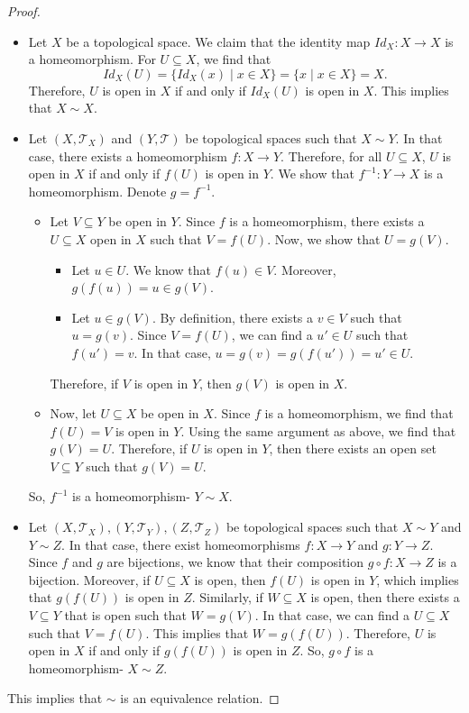 \documentclass[a4paper, openany]{memoir}
\theoremstyle{definition}
\theoremstyle{plain}
\begin{document}
\begin{proof}
\hspace*{0pt}
\begin{itemize}
    \item Let $X$ be a topological space. We claim that the identity map $Id_X: X \to X$ is a homeomorphism. For $U \subseteq X$, we find that
    \[Id_X(U) = \{Id_X(x) \mid x \in X\} = \{x \mid x \in X\} = X.\]
    Therefore, $U$ is open in $X$ if and only if $Id_X(U)$ is open in $X$. This implies that $X \sim X$.
    
    \item Let $(X, \mathcal{T}_X)$ and $(Y, \mathcal{T})$ be topological spaces such that $X \sim Y$. In that case, there exists a homeomorphism $f: X \to Y$. Therefore, for all $U \subseteq X$, $U$ is open in $X$ if and only if $f(U)$ is open in $Y$. We show that $f^{-1}: Y \to X$ is a homeomorphism. Denote $g = f^{-1}$. 
    \begin{itemize}
        \item Let $V \subseteq Y$ be open in $Y$. Since $f$ is a homeomorphism, there exists a $U \subseteq X$ open in $X$ such that $V = f(U)$. Now, we show that $U = g(V)$.
        \begin{itemize}
            \item Let $u \in U$. We know that $f(u) \in V$. Moreover, $g(f(u)) = u \in g(V)$.
            
            \item Let $u \in g(V)$. By definition, there exists a $v \in V$ such that $u = g(v)$. Since $V = f(U)$, we can find a $u' \in U$ such that $f(u') = v$. In that case, $u = g(v) = g(f(u')) = u' \in U$.
        \end{itemize}
        Therefore, if $V$ is open in $Y$, then $g(V)$ is open in $X$.
        
        \item Now, let $U \subseteq X$ be open in $X$. Since $f$ is a homeomorphism, we find that $f(U) = V$ is open in $Y$. Using the same argument as above, we find that $g(V) = U$. Therefore, if $U$ is open in $Y$, then there exists an open set $V \subseteq Y$ such that $g(V) = U$.
    \end{itemize}
    So, $f^{-1}$ is a homeomorphism- $Y \sim X$.
    
    \item Let $(X, \mathcal{T}_X), (Y, \mathcal{T}_Y), (Z, \mathcal{T}_Z)$ be topological spaces such that $X \sim Y$ and $Y \sim Z$. In that case, there exist homeomorphisms $f: X \to Y$ and $g: Y \to Z$. Since $f$ and $g$ are bijections, we know that their composition $g \circ f: X \to Z$ is a bijection. Moreover, if $U \subseteq X$ is open, then $f(U)$ is open in $Y$, which implies that $g(f(U))$ is open in $Z$. Similarly, if $W \subseteq X$ is open, then there exists a $V \subseteq Y$ that is open such that $W = g(V)$. In that case, we can find a $U \subseteq X$ such that $V = f(U)$. This implies that $W = g(f(U))$. Therefore, $U$ is open in $X$ if and only if $g(f(U))$ is open in $Z$. So, $g \circ f$ is a homeomorphism- $X \sim Z$.
\end{itemize}
This implies that $\sim$ is an equivalence relation.
\end{proof}
\newpage
\end{document}
